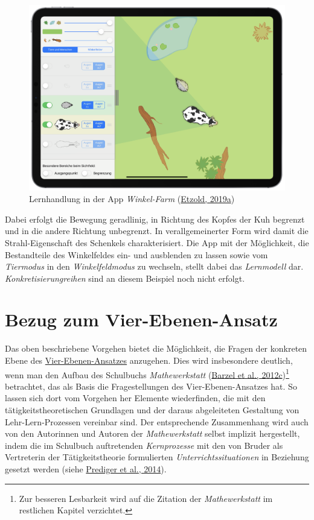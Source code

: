 \documentclass[
  ngerman,
]{scrbook}
\theoremstyle{definition}
\theoremstyle{definition}
\theoremstyle{definition}
\theoremstyle{definition}
\theoremstyle{remark}
\begin{document}
\begin{figure}

{\centering \includegraphics[width=0.5\linewidth]{pictures/2-Winkelfarm} 

}

\caption{Lernhandlung in der App \emph{Winkel-Farm} (\protect\hyperlink{ref-Etzold:2019}{Etzold, 2019a})}\label{fig:HandlungSchaf}
\end{figure}

Dabei erfolgt die Bewegung geradlinig, in Richtung des Kopfes der Kuh begrenzt und in die andere Richtung unbegrenzt. In verallgemeinerter Form wird damit die Strahl-Eigenschaft des Schenkels charakterisiert. Die App mit der Möglichkeit, die Bestandteile des Winkelfeldes ein- und ausblenden zu lassen sowie vom \emph{Tiermodus} in den \emph{Winkelfeldmodus} zu wechseln, stellt dabei das \emph{Lernmodell} dar. \emph{Konkretisierungreihen} sind an diesem Beispiel noch nicht erfolgt.

\hypertarget{bezug-zum-vier-ebenen-ansatz}{%
\section{Bezug zum Vier-Ebenen-Ansatz}\label{bezug-zum-vier-ebenen-ansatz}}

Das oben beschriebene Vorgehen bietet die Möglichkeit, die Fragen der \textcolor{concreteColor}{konkreten Ebene} des \protect\hyperlink{tab:fragen-ebenen}{Vier-Ebenen-Ansatzes} anzugehen. Dies wird insbesondere deutlich, wenn man den Aufbau des Schulbuchs \emph{Mathewerkstatt} (\protect\hyperlink{ref-Barzel2012}{Barzel et al., 2012c})\footnote{Zur besseren Lesbarkeit wird auf die Zitation der \emph{Mathewerkstatt} im restlichen Kapitel verzichtet.} betrachtet, das als Basis die Fragestellungen des Vier-Ebenen-Ansatzes hat. So lassen sich dort vom Vorgehen her Elemente wiederfinden, die mit den tätigkeitstheoretischen Grundlagen und der daraus abgeleiteten Gestaltung von Lehr-Lern-Prozessen vereinbar sind. Der entsprechende Zusammenhang wird auch von den Autorinnen und Autoren der \emph{Mathewerkstatt} selbst implizit hergestellt, indem die im Schulbuch auftretenden \emph{Kernprozesse} mit den von Bruder als Vertreterin der Tätigkeitstheorie formulierten \emph{Unterrichtssituationen} in Beziehung gesetzt werden (siehe \protect\hyperlink{ref-Prediger2014}{Prediger et al., 2014}).
\end{document}
